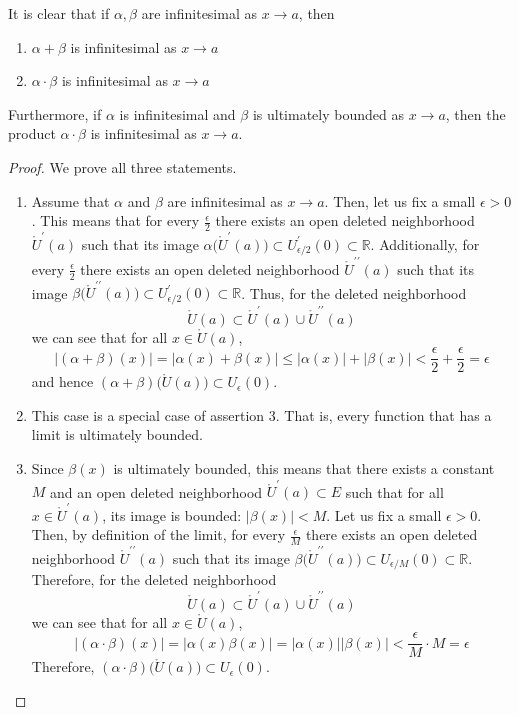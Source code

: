  \begin{lemma}
    It is clear that if $\alpha, \beta$ are infinitesimal as $x \rightarrow a$, then 
    \begin{enumerate}
      \item $\alpha + \beta$ is infinitesimal as $x \rightarrow a$
      \item $\alpha \cdot \beta$ is infinitesimal as $x \rightarrow a$
    \end{enumerate}
    Furthermore, if $\alpha$ is infinitesimal and $\beta$ is ultimately bounded as $x \rightarrow a$, then the product $\alpha \cdot \beta$ is infinitesimal as $x \rightarrow a$. 
  \end{lemma}
  \begin{proof}
  We prove all three statements. 
  \begin{enumerate}
    \item Assume that $\alpha$ and $\beta$ are infinitesimal as $x \rightarrow a$. Then, let us fix a small $\epsilon>0$. This means that for every $\frac{\epsilon}{2}$ there exists an open deleted neighborhood $\mathring{U}^\prime (a)$ such that its image $\alpha\big(\mathring{U}^\prime (a)\big)\subset U^\prime_{\epsilon/2} (0) \subset \mathbb{R}$. Additionally, for every $\frac{\epsilon}{2}$ there exists an open deleted neighborhood $\mathring{U}^{\prime\prime} (a)$ such that its image $\beta\big(\mathring{U}^{\prime\prime} (a)\big)\subset U^\prime_{\epsilon/2} (0) \subset \mathbb{R}$.
    Thus, for the deleted neighborhood 
    \[\mathring{U}(a) \subset \mathring{U}^\prime (a) \cup \mathring{U}^{\prime\prime} (a)\]
    we can see that for all $x \in \mathring{U}(a)$, 
    \[|(\alpha + \beta)(x)| = |\alpha (x) + \beta(x)| \leq |\alpha (x)| + |\beta(x)| < \frac{\epsilon}{2} + \frac{\epsilon}{2} = \epsilon\]
    and hence $(\alpha + \beta)\big( \mathring{U}(a)\big) \subset U_\epsilon (0)$. 
    \item This case is a special case of assertion 3. That is, every function that has a limit is ultimately bounded. 
    \item Since $\beta(x)$ is ultimately bounded, this means that there exists a constant $M$ and an open deleted neighborhood $\mathring{U}^\prime (a) \subset E$ such that for all $x \in \mathring{U}^\prime (a)$, its image is bounded: $|\beta(x)|<M$. Let us fix a small $\epsilon>0$. Then, by definition of the limit, for every $\frac{\epsilon}{M}$ there exists an open deleted neighborhood $\mathring{U}^{\prime\prime} (a)$ such that its image $\beta\big(\mathring{U}^{\prime\prime}(a)\big) \subset U_{\epsilon/M} (0) \subset \mathbb{R}$. Therefore, for the deleted neighborhood
    \[\mathring{U}(a) \subset \mathring{U}^\prime (a) \cup \mathring{U}^{\prime\prime}(a)\]
    we can see that for all $x \in \mathring{U} (a)$, 
    \[|(\alpha \cdot \beta)(x)| = |\alpha (x) \beta(x)| = |\alpha (x)| |\beta(x)| < \frac{\epsilon}{M} \cdot M = \epsilon\]
    Therefore, $(\alpha \cdot \beta)\big( \mathring{U} (a)\big) \subset U_\epsilon (0)$. 
  \end{enumerate}
  \end{proof}

